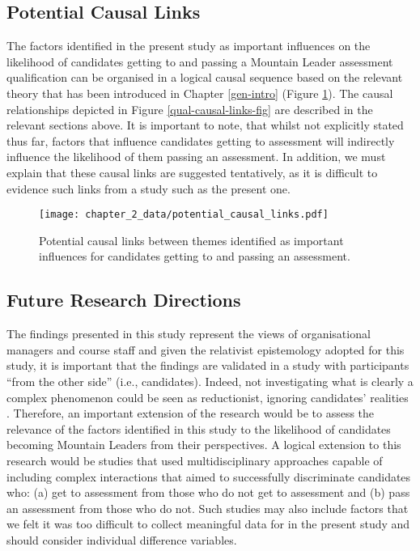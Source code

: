 \documentclass[
  12pt,
  a4paper,
]{book}
\begin{document}
\hypertarget{potential-causal-links}{%
\subsection{Potential Causal Links}\label{potential-causal-links}}

The factors identified in the present study as important influences on the likelihood of candidates getting to and passing a Mountain Leader assessment qualification can be organised in a logical causal sequence based on the relevant theory that has been introduced in Chapter \ref{gen-intro} (Figure \ref{fig:qual-causal-links-fig}). The causal relationships depicted in Figure \ref{qual-causal-links-fig} are described in the relevant sections above. It is important to note, that whilst not explicitly stated thus far, factors that influence candidates getting to assessment will indirectly influence the likelihood of them passing an assessment. In addition, we must explain that these causal links are suggested tentatively, as it is difficult to evidence such links from a study such as the present one.

\begin{figure}[h]
  \centering
  \texttt{[image: chapter\_2\_data/potential\_causal\_links.pdf]}
  \caption{Potential causal links between themes identified as important influences for candidates getting to and passing an assessment.}
  \label{fig:qual-causal-links-fig}
\end{figure}

\hypertarget{future-research-directions}{%
\subsection{Future Research Directions}\label{future-research-directions}}

The findings presented in this study represent the views of organisational managers and course staff and given the relativist epistemology adopted for this study, it is important that the findings are validated in a study with participants ``from the other side'' (i.e., candidates). Indeed, not investigating what is clearly a complex phenomenon could be seen as reductionist, ignoring candidates' realities \citep{Smith2008}. Therefore, an important extension of the research would be to assess the relevance of the factors identified in this study to the likelihood of candidates becoming Mountain Leaders from their perspectives. A logical extension to this research would be studies that used multidisciplinary approaches capable of including complex interactions that aimed to successfully discriminate candidates who: (a) get to assessment from those who do not get to assessment and (b) pass an assessment from those who do not. Such studies may also include factors that we felt it was too difficult to collect meaningful data for in the present study and should consider individual difference variables.
\end{document}
